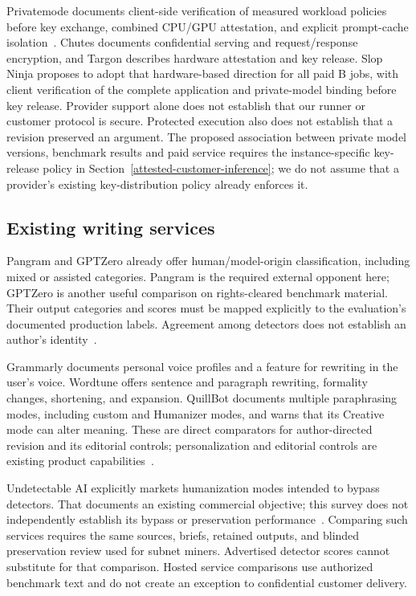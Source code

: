 Privatemode documents client-side verification of measured workload
policies before key exchange, combined CPU/GPU attestation, and explicit
prompt-cache isolation~\cite{privateattestation,privatecache}.
Chutes
documents confidential serving and request/response encryption, and
Targon describes hardware attestation and key release.
Slop Ninja proposes to adopt that hardware-based direction for all paid B
jobs, with client verification of the complete application and private-model
binding before key release. Provider support alone does not establish that
our runner or customer protocol is secure. Protected execution
also does not establish that a revision preserved an argument.
The proposed association between private model versions, benchmark results
and paid service requires the instance-specific key-release policy in
Section~\ref{attested-customer-inference}; we do not assume that a provider's
existing key-distribution policy already enforces it.

\subsection{Existing writing services}\label{related-services}

Pangram and GPTZero already offer human/model-origin classification,
including mixed or assisted categories. Pangram is the required
external opponent here; GPTZero is another useful comparison on
rights-cleared benchmark material. Their output categories and scores
must be mapped explicitly to the evaluation's documented production
labels. Agreement among detectors does not establish an author's
identity~\cite{pangramcard,gptzero}.

Grammarly documents personal voice profiles and a feature for rewriting
in the user's voice. Wordtune offers sentence and paragraph rewriting,
formality changes, shortening, and expansion. QuillBot documents
multiple paraphrasing modes, including custom and Humanizer modes, and
warns that its Creative mode can alter meaning. These are direct
comparators for author-directed revision and its editorial controls;
personalization and editorial controls are existing product
capabilities~\cite{grammarlyvoice,wordtune,quillbot}.

Undetectable AI explicitly markets humanization modes intended to
bypass detectors. That documents an existing commercial objective;
this survey does not independently establish its bypass or preservation
performance~\cite{undetectable}. Comparing such services requires the
same sources, briefs, retained outputs, and blinded preservation review
used for subnet miners. Advertised detector scores cannot
substitute for that comparison. Hosted service comparisons use
authorized benchmark text and do not create an exception to confidential
customer delivery.

